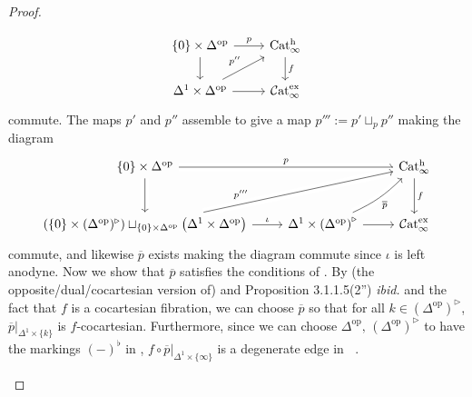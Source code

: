 \documentclass{article}
\DeclareMathOperator{\Cat}{\mathcal{C}at} %
\DeclareMathOperator{\Catex}{\Cat_\infty^{ex}} %
\DeclareMathOperator{\Cath}{Cat^h_\infty} %
\newcommand{\op}{\mathrm{op}} %
\theoremstyle{definition}
\begin{document}
\begin{proof}
\begin{enumerate}
\begin{equation*}
        \begin{tikzcd}
            \{0\} \times \Delta^\op \ar[r,"p"]\ar[d] &\Cath \ar[d,"f"] \\
            \Delta^1 \times \Delta^\op \ar[r] \ar[ru,"{p''}"] & \Catex
        \end{tikzcd}
        \end{equation*}
        commute. 
        The maps $ p' $ and $ p'' $ assemble to give a map $ p''' := p' \sqcup_p p'' $ making the diagram 
        \begin{equation*}
        \begin{tikzcd}[arrows={crossing over},row sep=large]
             \{0\} \times \Delta^\op \ar[rr,"p"]\ar[d] &  &\Cath \ar[d,"f"] \\
            \left(\{0\} \times (\Delta^\op)^\triangleright\right) \sqcup_{\{0\} \times \Delta^\op}\left(\Delta^1 \times \Delta^\op \right) \ar[r,"\iota"] \ar[rru,"{p'''}", near start] & \Delta^1 \times \left(\Delta^\op\right)^\triangleright \ar[r] \ar[ru,"{\overline{p}}"', bend right=10] & \Catex
        \end{tikzcd}
        \end{equation*}
        commute, and likewise $ \overline{p} $ exists making the diagram commute since $ \iota $ is left anodyne. 
        Now we show that $ \overline{p} $ satisfies the conditions of \cite[Proposition 4.3.1.9]{HTT}. 
        By (the opposite/dual/cocartesian version of) \cite[Remark 3.1.1.10]{HTT} and Proposition 3.1.1.5(2'') \emph{ibid.} and the fact that $ f $ is a cocartesian fibration, we can choose $ \overline{p} $ so that for all $ k \in (\Delta^\op)^\triangleright $, $ \overline{p}|_{\Delta^1 \times \{k\}} $ is $f$-cocartesian. 
        Furthermore, since we can choose $ \Delta^\op, \,\left(\Delta^\op\right)^\triangleright $ to have the markings $ (-)^\flat $ in \cite[Remark 3.1.1.10]{HTT}, $ f \circ \overline{p}|_{\Delta^1 \times \{\infty\}} $ is a degenerate edge in $ \Catex $. 


\end{enumerate}
\end{proof}
\end{document}
